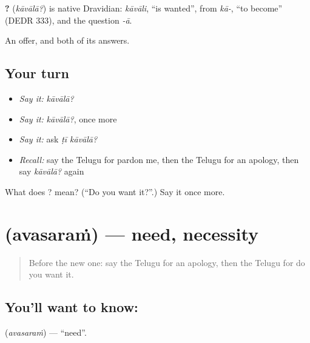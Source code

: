 \begin{cousinweb}
\textbf{?} (\emph{kāvālā?}) is native Dravidian: \emph{kāvāli}, \textquotedblleft{}is wanted\textquotedblright{}, from \emph{kā-}, \textquotedblleft{}to become\textquotedblright{} (DEDR 333), and the question \emph{-ā}.
\end{cousinweb}

\begin{grammarlens}[title={What you've built}]
An offer, and both of its answers.
\end{grammarlens}

\subsection*{Your turn}
\begin{itemize}
\raggedright
  \item \emph{Say it:} \emph{kāvālā?}
  \item \emph{Say it:} \emph{kāvālā?}, once more
  \item \emph{Say it:} ask \emph{ṭī kāvālā?}
  \item \emph{Recall:} say the Telugu for pardon me, then the Telugu for an apology, then say \emph{kāvālā?} again
\end{itemize}

\begin{tcolorbox}[breakable,colback=teal!4,colframe=teal!35!black,title={Before you move on}]
What does ? mean? (\textquotedblleft{}Do you want it?\textquotedblright{}.) Say it once more.
\end{tcolorbox}
\section[\texorpdfstring{\te{అవసరం} (avasaraṁ)}{అవసరం (avasaraṁ)}]{ (avasaraṁ) — need, necessity}

\label{lesson:TE-C94-need}



\begin{quote}
Before the new one: say the Telugu for an apology, then the Telugu for do you want it.
\end{quote}

\subsection*{You'll want to know: }
\textbf{} (\emph{avasaraṁ}) — \textquotedblleft{}need\textquotedblright{}.


